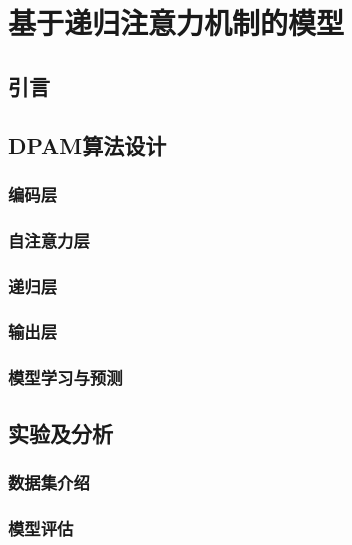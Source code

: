 
\chapter{基于递归注意力机制的模型}


\section{引言}


\section{DPAM算法设计}

\subsection{编码层}

\subsection{自注意力层}

\subsection{递归层}

\subsection{输出层}

\subsection{模型学习与预测}


\section{实验及分析}

\subsection{数据集介绍}

\subsection{模型评估}

